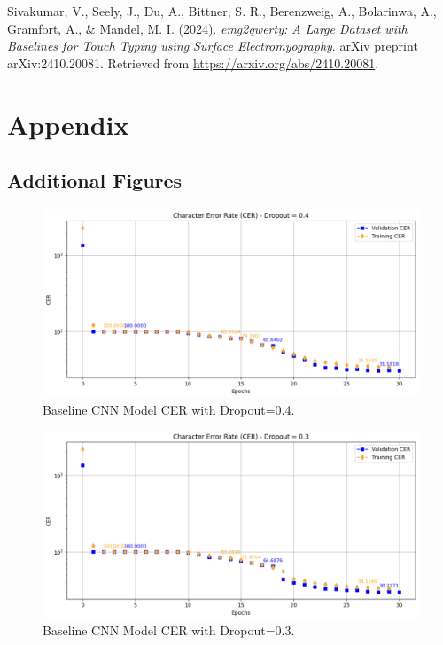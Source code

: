 \documentclass{article}
\begin{document}
Sivakumar, V., Seely, J., Du, A., Bittner, S. R., Berenzweig, A., Bolarinwa, A., Gramfort, A., \& Mandel, M. I. (2024).  
\textit{emg2qwerty: A Large Dataset with Baselines for Touch Typing using Surface Electromyography}.  
arXiv preprint arXiv:2410.20081.  
Retrieved from \url{https://arxiv.org/abs/2410.20081}.

\section{Appendix}
\label{sec:appendix}
\subsection{Additional Figures}
\begin{figure}[ht]
  \centering
  \includegraphics[width=0.8\linewidth]{Dropout0.4_CER.png} 
  \caption{Baseline CNN Model CER with Dropout=0.4.}
  \label{fig:dropout0.4_cer}
\end{figure}

\begin{figure}[ht]
  \centering
  \includegraphics[width=0.8\linewidth]{Dropout0.3_CER.png} 
  \caption{Baseline CNN Model CER with Dropout=0.3.}
  \label{fig:dropout0.3_cer}
\end{figure}
\end{document}
